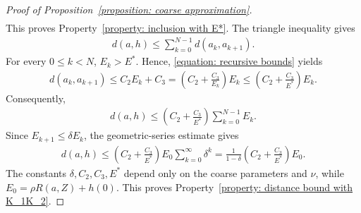 \documentclass[12pt,reqno]{amsart}
\numberwithin{equation}{section}
\begin{document}
\begin{proof}[Proof of Proposition~\ref{proposition: coarse approximation}]
\begin{align*}
    \end{align*}
    This proves Property~\ref{property: inclusion with E*}. The triangle inequality gives
    \begin{align*}
        d(a,h)\le \sum_{k=0}^{N-1} d(a_k,a_{k+1}).
    \end{align*}
    For every $0\le k<N$, $E_k>E^*$. Hence, \eqref{equation: recursive bounds} yields
    \begin{align*}
        d(a_k,a_{k+1})\le C_2 E_k+C_3=\left(C_2+\frac{C_3}{E_k}\right)E_k\le \left(C_2+\frac{C_3}{E^*}\right)E_k.
    \end{align*}
    Consequently,
    \begin{align*}
        d(a,h)\le \left(C_2+\frac{C_3}{E^*}\right) \sum_{k=0}^{N-1}E_k.
    \end{align*}
    Since $E_{k+1}\le\delta E_k$, the geometric-series estimate gives
    \begin{align*}
        d(a,h)\le \left(C_2+\frac{C_3}{E^*}\right)E_0 \sum_{k=0}^{\infty}\delta^k=\frac{1}{1-\delta}\left(C_2+\frac{C_3}{E^*}\right)E_0.
    \end{align*}
    The constants $\delta,C_2,C_3,E^*$ depend only on the coarse parameters and $\nu$, while $E_0=\rho R(a,Z)+h(0)$. This proves Property~\ref{property: distance bound with K_1K_2}.
\end{proof}


\end{document}
